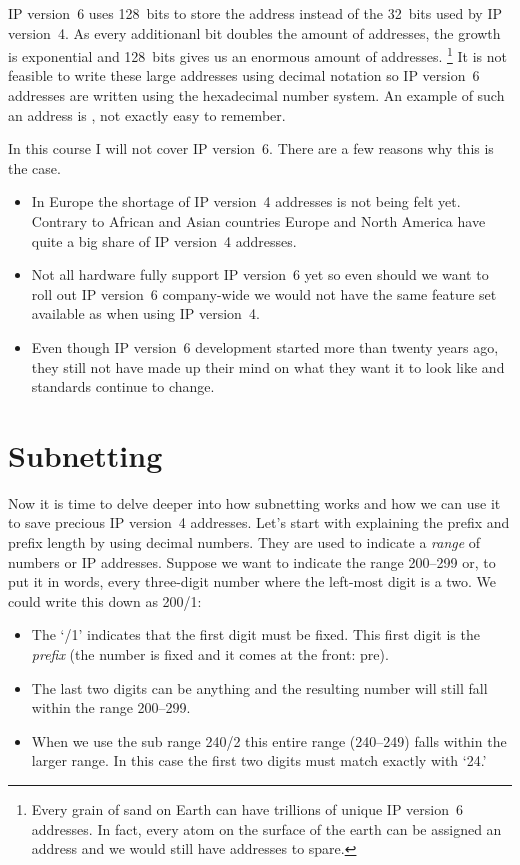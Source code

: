 \acs{IP} version~6 uses 128~bits to store the address instead of the 32~bits used by \acs{IP} version~4.
As every additionanl bit doubles the amount of addresses, the growth is exponential and 128~bits gives us an enormous amount of addresses.%
   \footnote{%
      Every grain of sand on Earth can have trillions of unique \acs{IP} version~6 addresses.
      In fact, every atom on the surface of the earth can be assigned an address and we would still have addresses to spare.
   }
It is not feasible to write these large addresses using decimal notation so \acs{IP} version~6 addresses are written using the hexadecimal number system.
An example of such an address is , not exactly easy to remember.

In this course I will not cover \acs{IP} version~6.
There are a few reasons why this is the case.
\begin{itemize}
\item
   In Europe the shortage of \acs{IP} version~4 addresses is not being felt yet.
   Contrary to African and Asian countries Europe and North America have quite a big share of \acs{IP} version~4 addresses.
\item
   Not all hardware fully support \acs{IP} version~6 yet so even should we want to roll out \acs{IP} version~6 company-wide we would not have the same feature set available as when using \acs{IP} version~4.
\item
   Even though \acs{IP} version~6 development started more than twenty years ago, they still not have made up their mind on what they want it to look like and standards continue to change.
\end{itemize}



\section{Subnetting}
\label{sec:ip-subnetting}

Now it is time to delve deeper into how subnetting works and how we can use it to save precious \acs{IP} version~4 addresses.
Let's start with explaining the prefix and prefix length by using decimal numbers.
They are used to indicate a \emph{range} of numbers or \acs{IP} addresses.
Suppose we want to indicate the range 200--299 or, to put it in words, every three-digit number where the left-most digit is a two.
We could write this down as 200/1:
\begin{itemize}
\item
   The `/1' indicates that the first digit must be fixed.
   This first digit is the \emph{prefix} (the number is fixed and it comes at the front: pre).
\item
   The last two digits can be anything and the resulting number will still fall within the range 200--299.
\item
   When we use the sub range 240/2 this entire range (240--249) falls within the larger range.
   In this case the first two digits must match exactly with `24.'
\end{itemize}

